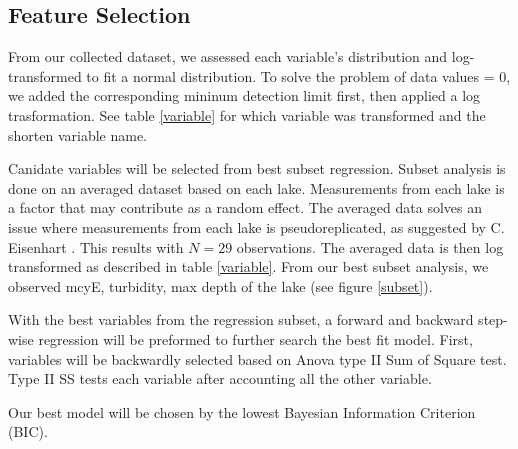 \documentclass{ou-thesis}
\begin{document}
\subsection{Feature Selection}

From our collected dataset, we assessed each variable's distribution and log-transformed to fit a normal distribution. To solve the problem of data values = 0, we added the corresponding mininum detection limit first, then applied a log trasformation. See table \ref{variable} for which variable was transformed and the shorten variable name.

Canidate variables will be selected from best subset regression. Subset analysis is done on an averaged dataset based on each lake. Measurements from each lake is a factor that may contribute as a random effect. The averaged data solves an issue where measurements from each lake is pseudoreplicated, as suggested by C. Eisenhart \cite{eisenhart_assumptions_1947}. This results with  $N=29$ observations. The averaged data is then log transformed as described in table \ref{variable}. From our best subset analysis, we observed mcyE, turbidity, max depth of the lake (see figure \ref{subset}).

With the best variables from the regression subset, a forward and backward step-wise regression will be preformed to further search the best fit model. First, variables will be backwardly selected based on Anova type II Sum of Square test. Type II  SS tests each variable after accounting all the other variable.


Our best model will be chosen by the lowest Bayesian Information Criterion (BIC).
\end{document}
